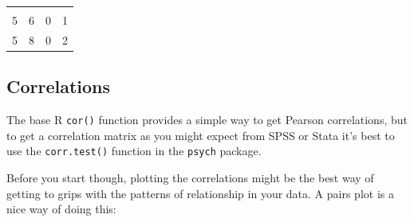 \documentclass[]{article}
\newenvironment{Shaded}{\begin{snugshade}}{\end{snugshade}}
\newcommand{\KeywordTok}[1]{\textcolor[rgb]{0.13,0.29,0.53}{\textbf{#1}}}
\newcommand{\StringTok}[1]{\textcolor[rgb]{0.31,0.60,0.02}{#1}}
\newcommand{\OperatorTok}[1]{\textcolor[rgb]{0.81,0.36,0.00}{\textbf{#1}}}
\newcommand{\NormalTok}[1]{#1}
\theoremstyle{definition}
\theoremstyle{definition}
\theoremstyle{definition}
\theoremstyle{remark}
\begin{document}
\begin{longtable}[]{@{}cccc@{}}
\begin{minipage}[t]{0.09\columnwidth}
\end{minipage}\tabularnewline
\begin{minipage}[t]{0.09\columnwidth}\centering\strut
5\strut
\end{minipage} & \begin{minipage}[t]{0.07\columnwidth}\centering\strut
6\strut
\end{minipage} & \begin{minipage}[t]{0.09\columnwidth}\centering\strut
0\strut
\end{minipage} & \begin{minipage}[t]{0.09\columnwidth}\centering\strut
1\strut
\end{minipage}\tabularnewline
\begin{minipage}[t]{0.09\columnwidth}\centering\strut
5\strut
\end{minipage} & \begin{minipage}[t]{0.07\columnwidth}\centering\strut
8\strut
\end{minipage} & \begin{minipage}[t]{0.09\columnwidth}\centering\strut
0\strut
\end{minipage} & \begin{minipage}[t]{0.09\columnwidth}\centering\strut
2\strut
\end{minipage}\tabularnewline
\bottomrule
\end{longtable}

\hypertarget{correlations}{\subsection*{Correlations}\label{correlations}}

The base R \texttt{cor()} function provides a simple way to get Pearson
correlations, but to get a correlation matrix as you might expect from
SPSS or Stata it's best to use the \texttt{corr.test()} function in the
\texttt{psych} package.

Before you start though, plotting the correlations might be the best way
of getting to grips with the patterns of relationship in your data. A
pairs plot is a nice way of doing this:

\begin{Shaded}
\end{Shaded}
\end{document}
